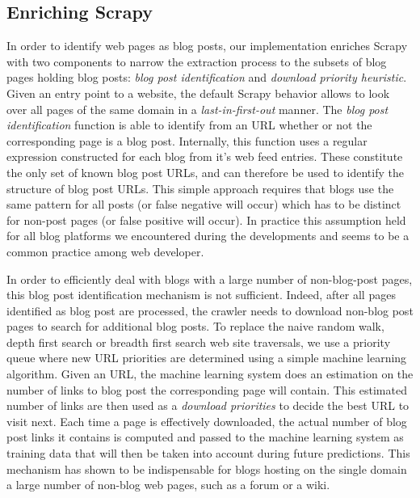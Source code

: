 \subsection{Enriching Scrapy}\label{enrichingscrapy}
In order to identify web pages as blog posts, our implementation enriches Scrapy with two components to narrow the extraction process to the subsets of blog pages holding blog posts: \emph{blog post identification} and \emph{download priority heuristic}. Given an entry point to a website, the default Scrapy behavior allows to look over all pages of the same domain in a \emph{last-in-first-out} manner. The \emph{blog post identification} function is able to identify from an URL whether or not the corresponding page is a blog post. Internally, this function uses a regular expression constructed for each blog from it's web feed entries. These constitute the only set of known blog post URLs, and can therefore be used to identify the structure of blog post URLs. This simple approach requires that blogs use the same pattern for all posts (or false negative will occur) which has to be distinct for non-post pages (or false positive will occur). In practice this assumption held for all blog platforms we encountered during the developments and seems to be a common practice among web developer.

In order to efficiently deal with blogs with a large number of non-blog-post pages, this blog post identification mechanism is not sufficient. Indeed, after all pages identified as blog post are processed, the crawler needs to download non-blog post pages to search for additional blog posts. To replace the naive random walk, depth first search or breadth first search web site traversals, we use a priority queue where new URL priorities are determined using a simple machine learning algorithm. Given an URL, the machine learning system does an estimation on the number of links to blog post the corresponding page will contain. This estimated number of links are then used as a \emph{download priorities} to decide the best URL to visit next. Each time a page is effectively downloaded, the actual number of blog post links it contains is computed and passed to the machine learning system as training data that will then be taken into account during future predictions. This mechanism has shown to be indispensable for blogs hosting on the single domain a large number of non-blog web pages, such as a forum or a wiki.



